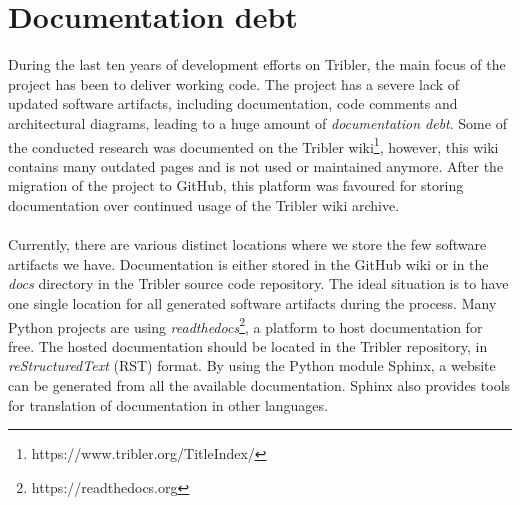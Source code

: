 
\section{Documentation debt}
\label{sec:software-artifacts}
During the last ten years of development efforts on Tribler, the main focus of the project has been to deliver working code. The project has a severe lack of updated software artifacts, including documentation, code comments and architectural diagrams, leading to a huge amount of \emph{documentation debt}. Some of the conducted research was documented on the Tribler wiki\footnote{https://www.tribler.org/TitleIndex/}, however, this wiki contains many outdated pages and is not used or maintained anymore. After the migration of the project to GitHub, this platform was favoured for storing documentation over continued usage of the Tribler wiki archive.\\\\
Currently, there are various distinct locations where we store the few software artifacts we have. Documentation is either stored in the GitHub wiki or in the \emph{docs} directory in the Tribler source code repository. The ideal situation is to have one single location for all generated software artifacts during the process. Many Python projects are using \emph{readthedocs}\footnote{https://readthedocs.org}, a platform to host documentation for free. The hosted documentation should be located in the Tribler repository, in \emph{reStructuredText} (RST) format. By using the Python module Sphinx, a website can be generated from all the available documentation. Sphinx also provides tools for translation of documentation in other languages.\\

